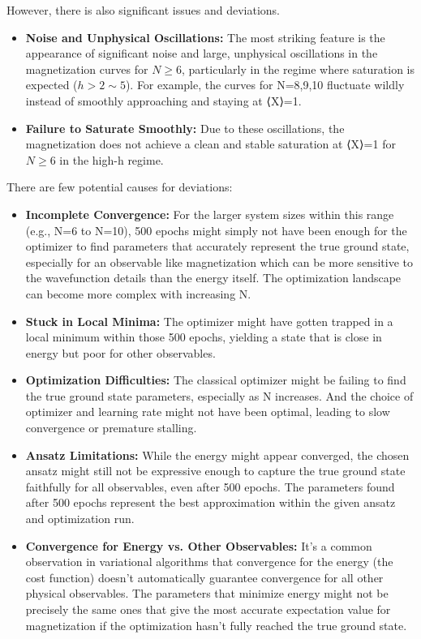 \documentclass[pre,twocolumn,floatfix]{revtex4-1}
\begin{document}
However, there is also significant issues and deviations. 
\begin{itemize}
    \item \textbf{Noise and Unphysical Oscillations:} The most striking feature is the appearance of significant noise and large, unphysical oscillations in the magnetization curves for $N\geq 6$, particularly in the regime where saturation is expected ($h>2\sim5$). For example, the curves for N=8,9,10 fluctuate wildly instead of smoothly approaching and staying at ⟨X⟩=1.
    \item \textbf{Failure to Saturate Smoothly:} Due to these oscillations, the magnetization does not achieve a clean and stable saturation at ⟨X⟩=1 for $N\geq6$ in the high-h regime.
\end{itemize}

There are few potential causes for deviations: 
\begin{itemize}
    \item \textbf{Incomplete Convergence:} For the larger system sizes within this range (e.g., N=6 to N=10), 500 epochs might simply not have been enough for the optimizer to find parameters that accurately represent the true ground state, especially for an observable like magnetization which can be more sensitive to the wavefunction details than the energy itself. The optimization landscape can become more complex with increasing N.
    \item \textbf{Stuck in Local Minima:} The optimizer might have gotten trapped in a local minimum within those 500 epochs, yielding a state that is close in energy but poor for other observables.
    \item \textbf{Optimization Difficulties:} The classical optimizer might be failing to find the true ground state parameters, especially as N increases. And the choice of optimizer and learning rate might not have been optimal, leading to slow convergence or premature stalling.
    \item \textbf{Ansatz Limitations:} While the energy might appear converged, the chosen ansatz might still not be expressive enough to capture the true ground state faithfully for all observables, even after 500 epochs. The parameters found after 500 epochs represent the best approximation within the given ansatz and optimization run.
    \item \textbf{Convergence for Energy vs. Other Observables:} It's a common observation in variational algorithms that convergence for the energy (the cost function) doesn't automatically guarantee convergence for all other physical observables. The parameters that minimize energy might not be precisely the same ones that give the most accurate expectation value for magnetization if the optimization hasn't fully reached the true ground state.
\end{itemize}
\end{document}
